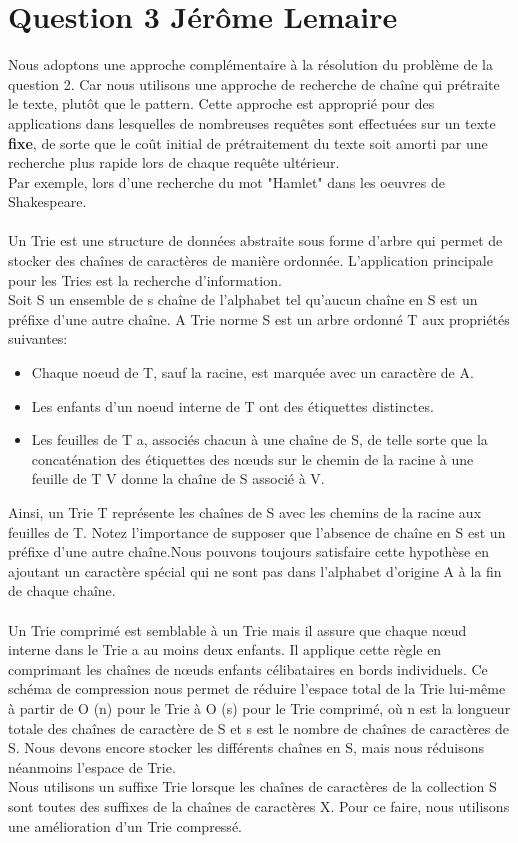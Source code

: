 \documentclass[10pt,a4paper]{article}
\begin{document}
\section*{Question 3 Jérôme Lemaire}
Nous adoptons une approche complémentaire à la résolution du problème de la question 2. Car nous utilisons une approche de recherche de chaîne qui prétraite le texte, plutôt que le pattern. Cette approche est approprié pour des applications dans lesquelles de nombreuses requêtes sont effectuées sur un texte \textbf{fixe}, de sorte que le coût initial de prétraitement du texte soit amorti par une recherche plus rapide lors de chaque requête ultérieur.\\
Par exemple, lors d'une recherche du mot "Hamlet" dans les oeuvres de Shakespeare.\\
\\
Un Trie est une structure de données abstraite sous forme d'arbre qui permet de stocker des chaînes de caractères de manière ordonnée. L'application principale pour les Tries est la recherche d'information. \\
Soit S un ensemble de s chaîne de l'alphabet tel qu'aucun chaîne en S est un préfixe d'une autre chaîne. A Trie norme S est un arbre ordonné T aux propriétés suivantes:
\begin{itemize}
\item Chaque noeud de T, sauf la racine, est marquée avec un caractère de A.
\item Les enfants d'un noeud interne de T ont des étiquettes distinctes.
\item Les feuilles de T a, associés chacun à une chaîne de S, de telle sorte que la concaténation des étiquettes des nœuds sur le chemin de la racine à une feuille de T V donne la chaîne de S associé à V.
\end{itemize}
Ainsi, un Trie T représente les chaînes de S avec les chemins de la racine aux feuilles de T.
Notez l'importance de supposer que l'absence de chaîne en S est un préfixe d'une autre chaîne.Nous pouvons toujours satisfaire cette hypothèse en ajoutant un caractère spécial qui ne sont pas dans l'alphabet d'origine A à la fin de chaque chaîne. \\\\
Un Trie comprimé est semblable à un Trie mais il assure que chaque nœud interne dans le Trie a au moins deux enfants. Il applique cette règle en comprimant les chaînes de nœuds enfants célibataires en bords individuels.
Ce schéma de compression nous permet de réduire l'espace total de la Trie lui-même à partir de O (n) pour le Trie à O (s) pour le Trie comprimé, où n est la longueur totale des chaînes de caractère de S et s est le nombre de chaînes de caractères de S. Nous devons encore stocker les différents chaînes en S, mais nous réduisons néanmoins l'espace de Trie.\\
Nous utilisons un suffixe Trie lorsque les chaînes de caractères de la collection S sont toutes des suffixes de la chaînes de caractères X. Pour ce faire, nous utilisons une amélioration d’un Trie compressé.\\
\end{document}
